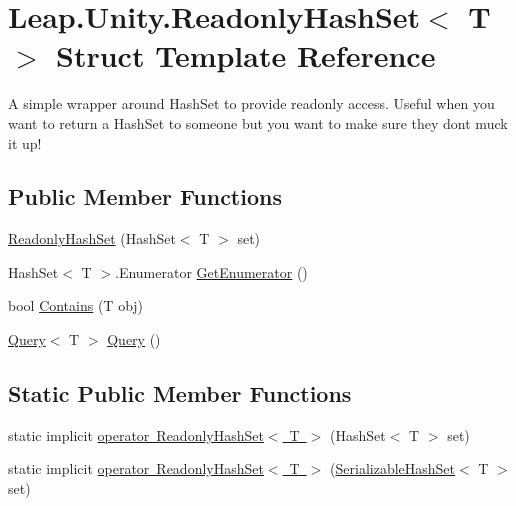 \hypertarget{struct_leap_1_1_unity_1_1_readonly_hash_set}{}\section{Leap.\+Unity.\+Readonly\+Hash\+Set$<$ T $>$ Struct Template Reference}
\label{struct_leap_1_1_unity_1_1_readonly_hash_set}


A simple wrapper around Hash\+Set to provide readonly access. Useful when you want to return a Hash\+Set to someone but you want to make sure they don\textquotesingle{}t muck it up!  


\subsection*{Public Member Functions}
\begin{DoxyCompactItemize}
\item 
\mbox{\hyperlink{struct_leap_1_1_unity_1_1_readonly_hash_set_a6333253382bb5c531d714107afdfc39b}{Readonly\+Hash\+Set}} (Hash\+Set$<$ T $>$ set)
\item 
Hash\+Set$<$ T $>$.Enumerator \mbox{\hyperlink{struct_leap_1_1_unity_1_1_readonly_hash_set_aa52e65079c59c9661f18768d9b0c3187}{Get\+Enumerator}} ()
\item 
bool \mbox{\hyperlink{struct_leap_1_1_unity_1_1_readonly_hash_set_a6830c4b8286125be121ec758483a6524}{Contains}} (T obj)
\item 
\mbox{\hyperlink{struct_leap_1_1_unity_1_1_query_1_1_query}{Query}}$<$ T $>$ \mbox{\hyperlink{struct_leap_1_1_unity_1_1_readonly_hash_set_a83284baa667b7e1e17703b869947f7df}{Query}} ()
\end{DoxyCompactItemize}
\subsection*{Static Public Member Functions}
\begin{DoxyCompactItemize}
\item 
static implicit \mbox{\hyperlink{struct_leap_1_1_unity_1_1_readonly_hash_set_aca24867a8671d5068905f1c38641fd5d}{operator Readonly\+Hash\+Set$<$ T $>$}} (Hash\+Set$<$ T $>$ set)
\item 
static implicit \mbox{\hyperlink{struct_leap_1_1_unity_1_1_readonly_hash_set_ac61ad56b6aaddcc9b9ac924e4e1bb737}{operator Readonly\+Hash\+Set$<$ T $>$}} (\mbox{\hyperlink{class_leap_1_1_unity_1_1_serializable_hash_set}{Serializable\+Hash\+Set}}$<$ T $>$ set)
\end{DoxyCompactItemize}
